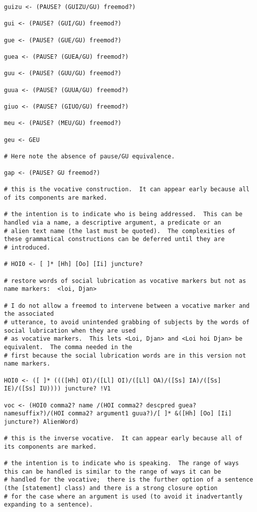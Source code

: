 \documentclass{article}
\begin{document}
\begin{verbatim}
guizu <- (PAUSE? (GUIZU/GU) freemod?)

gui <- (PAUSE? (GUI/GU) freemod?)

gue <- (PAUSE? (GUE/GU) freemod?)

guea <- (PAUSE? (GUEA/GU) freemod?)

guu <- (PAUSE? (GUU/GU) freemod?)

guua <- (PAUSE? (GUUA/GU) freemod?)

giuo <- (PAUSE? (GIUO/GU) freemod?)

meu <- (PAUSE? (MEU/GU) freemod?)

geu <- GEU

# Here note the absence of pause/GU equivalence.

gap <- (PAUSE? GU freemod?)

# this is the vocative construction.  It can appear early because all of its components are marked.

# the intention is to indicate who is being addressed.  This can be handled via a name, a descriptive argument, a predicate or an
# alien text name (the last must be quoted).  The complexities of these grammatical constructions can be deferred until they are
# introduced.

# HOI0 <- [ ]* [Hh] [Oo] [Ii] juncture?  

# restore words of social lubrication as vocative markers but not as name markers:  <loi, Djan>  

# I do not allow a freemod to intervene between a vocative marker and the associated
# utterance, to avoid unintended grabbing of subjects by the words of social lubrication when they are used
# as vocative markers.  This lets <Loi, Djan> and <Loi hoi Djan> be equivalent.  The comma needed in the
# first because the social lubrication words are in this version not name markers.
       
HOI0 <- ([ ]* ((([Hh] OI)/([Ll] OI)/([Ll] OA)/([Ss] IA)/([Ss] IE)/([Ss] IU)))) juncture? !V1

voc <- (HOI0 comma2? name /(HOI comma2? descpred guea? namesuffix?)/(HOI comma2? argument1 guua?)/[ ]* &([Hh] [Oo] [Ii] juncture?) AlienWord)

# this is the inverse vocative.  It can appear early because all of its components are marked.

# the intention is to indicate who is speaking.  The range of ways this can be handled is similar to the range of ways it can be
# handled for the vocative;  there is the further option of a sentence (the [statement] class) and there is a strong closure option
# for the case where an argument is used (to avoid it inadvertantly expanding to a sentence).


\end{verbatim}
\end{document}
